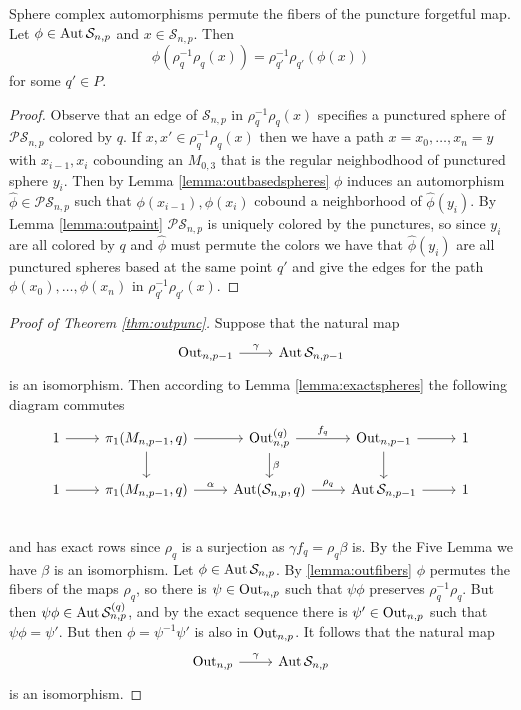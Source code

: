 \begin{lemma}
  Sphere complex automorphisms permute the fibers of the puncture forgetful map.
  Let $\phi \in \operatorname{Aut} \mathcal S_{n,p}$ and $x \in \mathcal S_{n,p}$.
  Then
  $$
  \phi \left ( \rho^{-1}_q\rho_q(x) \right )
  =\rho^{-1}_{q'}\rho_{q'}( \phi(x))
  $$
  for some $q' \in P$.
  \label{lemma:outfibers}
\end{lemma}

\begin{proof}
  Observe that an edge of $\mathcal S_{n,p}$
  in $\rho^{-1}_q\rho_q(x)$ specifies a punctured sphere of $\mathcal {PS}_{n,p}$
  colored by $q$.
  If $x,x' \in \rho^{-1}_q\rho_q(x)$ then we have a path
  $x=x_0, \ldots, x_n=y$ with $x_{i-1},x_{i}$  cobounding an $M_{0,3}$ that is the
  regular neighbodhood of punctured sphere $y_i$.
  Then by Lemma \ref{lemma:outbasedspheres} $\phi$ induces an automorphism $\hat \phi \in \mathcal{PS}_{n,p}$ such that $\phi(x_{i-1}),\phi(x_{i})$
  cobound a neighborhood of $\hat \phi(y_i)$.
  By Lemma \ref{lemma:outpaint} $\mathcal{PS}_{n,p}$ is uniquely colored by the punctures, so
  since $y_i$ are all colored by $q$ and $\hat \phi$ must permute the colors we have that
  $\hat \phi(y_i)$ are all punctured spheres based at the same point $q'$ and give the edges for the path
  $\phi(x_0), \ldots, \phi(x_n)$ in $\rho^{-1}_{q'}\rho_{q'}(x)$.
\end{proof}


\begin{proof}[Proof of Theorem \ref{thm:outpunc}]
Suppose that the natural map
$$
\begin{tikzcd}
\oout_{n,p-1} \arrow{r}{\gamma}& \aaut \mathcal S_{n,p-1}
\end{tikzcd}
$$
is an isomorphism.
Then according to Lemma
\ref{lemma:exactspheres} the following diagram commutes
$$
\begin{tikzcd}
1 \arrow[r]&
\pi_1(M_{n,p-1},q) \arrow[r] \arrow[d]&
\oout_{n,p}^{(q)}  \arrow{r}{f_q} \arrow{d}{\beta}&
\oout_{n,p-1} \arrow[r] \arrow[d]&
1 \\
1 \arrow[r]&
\pi_1(M_{n,p-1},q) \arrow{r}{\alpha}&
\aaut (\mathcal S_{n,p}, q)  \arrow{r}{\rho_{q}}&
\aaut \mathcal S_{n,p-1} \arrow{r}&
1 \\
\end{tikzcd}
$$
and has exact rows
since $\rho_q$ is a surjection as $\gamma f_q = \rho_q \beta$
is. By the Five Lemma we have $\beta$ is an isomorphism.
Let $\phi \in \operatorname{Aut} \mathcal S_{n,p}$.
By \ref{lemma:outfibers} $\phi$ permutes the fibers of the maps $\rho_q$,
so there is $\psi \in \operatorname{Out}_{n,p}$ such that
$\psi \phi$ preserves $\rho^{-1}_q \rho_q$.
But then  $\psi \phi \in \operatorname{Aut} \mathcal S_{n,p}^{(q)}$, and by the exact sequence
there is $\psi' \in \operatorname{Out}_{n,p}$ such that $\psi \phi=\psi'$.
But then $\phi = \psi^{-1} \psi'$ is also in $\operatorname{Out}_{n,p}$.
It follows that the natural map
$$
\begin{tikzcd}
\oout_{n,p} \arrow{r}{\gamma}& \aaut \mathcal S_{n,p}
\end{tikzcd}
$$
is an isomorphism.
\end{proof}
